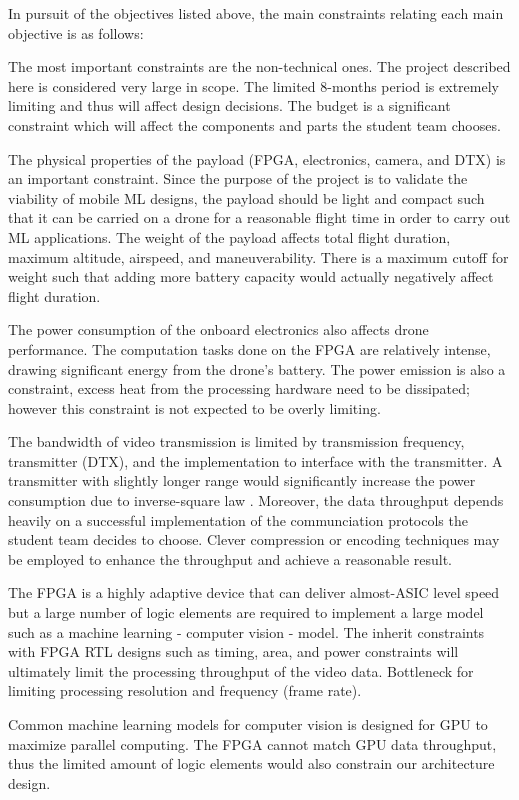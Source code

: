 In pursuit of the objectives listed above, the main constraints relating 
each main objective is as follows:

The most important constraints are the non-technical ones. The project described
here is considered very large in scope. The limited 8-months period is extremely
limiting and thus will affect design decisions. The budget is a significant
constraint which will affect the components and parts the student team chooses.

The physical properties of the payload (FPGA, electronics, camera, and  DTX) is an important constraint. Since the purpose of the project
is to validate the viability of mobile ML designs, the payload should be light and compact such
that it can be carried on a drone for a reasonable flight time in order to carry out ML applications.
The weight of the payload affects total flight duration, maximum altitude, airspeed, and maneuverability. 
There is a maximum cutoff for weight such that adding more battery capacity would actually negatively affect flight duration.

The power consumption of the onboard electronics also affects drone performance.
The computation tasks done on the FPGA are relatively intense, drawing significant energy from the drone's battery. 
The power emission is also a constraint, excess heat from the processing
hardware need to be dissipated; however this constraint is not expected to be overly limiting.

The bandwidth of video transmission is limited by transmission frequency, transmitter (DTX), and
the implementation to interface with the transmitter. A transmitter with slightly longer range would
significantly increase the power consumption due to inverse-square law \cite{wiki-inverse-square}.
Moreover, the data throughput depends heavily on a successful implementation of the communciation
protocols the student team decides to choose. Clever compression or encoding techniques may be
employed to enhance the throughput and achieve a reasonable result.

The FPGA is a highly adaptive device that can deliver almost-ASIC level speed
but a large number of logic elements are required to implement a large model 
such as a machine learning - computer vision - model. The inherit constraints
with FPGA RTL designs such as timing, area, and power constraints will ultimately
limit the processing throughput of the video data. Bottleneck for limiting
processing resolution and frequency (frame rate).

Common machine learning models for computer vision is designed for GPU to
maximize parallel computing. The FPGA cannot match GPU data throughput, thus
the limited amount of logic elements would also constrain our architecture
design.
